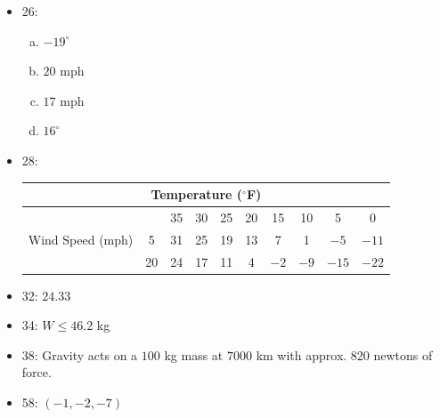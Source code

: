 \documentclass[9pt]{extarticle}
\begin{document}
\begin{problem}{12.1}
\begin{itemize}
\begin{center}
        \end{center}
      \item 26:
        \begin{enumerate}[(a)]
          \item $-19^{\circ}$
          \item $20$ mph
          \item $17$ mph
          \item $16^{\circ}$
        \end{enumerate}
      \item 28:
        \begin{center}
          \renewcommand{\arraystretch}{1.5}
          \begin{tabular}{|c||c||c|c|c|c|c|c|c|c|}
            \hline
            \multicolumn{10}{|c|}{Temperature ($^{\circ}$F)}\\
            \hline
            \multirow{3}{7em}{Wind Speed (mph)}&& 35 & 30 & 25 & 20 & 15 & 10 & 5 & 0 \\
            \cline{3-10}
            & 5 & 31 & 25 & 19 & 13 & 7 & 1 & $-5$ & $-11$\\
                                               & 20 & 24 & 17 & 11 & 4 & $-2$ & $-9$ & $-15$ & $-22$\\
                                               \hline
          \end{tabular}
        \end{center}
        \item 32: $24.33$
        \item 34: $W\leq 46.2$ kg
        \item 38: Gravity acts on a $100$ kg mass at $7000$ km with approx. 820 newtons of force.
        \item 58: $(-1,-2,-7)$
    \end{itemize}
  \end{problem}
\end{document}

